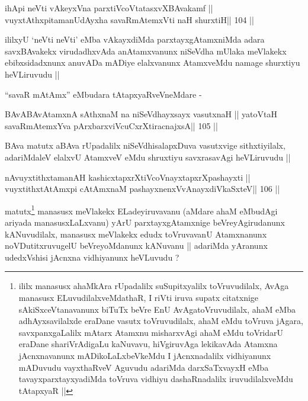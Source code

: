 \begin{shl}
ihApi neVti vAkeyxVna parxtiVcoV\s tatasxvXBAvakamf ||
vuyxtAthxpitamanUdAyx\s\s ha savaRmAtemxVti naH shurxtiH\hfill || 104 ||
\end{shl}

\begin{artha}
ililxyU `neVti neVti' eMba vAkayxdiMda parxtayxgAtamxniMda adara
savxBAvakekx virudadhxvAda anAtamxvanunx niSeVdha mUlaka meVlakekx
ebibxsidadxnunx anuvADa mADiye elalxvanunx AtamxveMdu namage shurxtiyu
heVLiruvudu ||
\end{artha}

\begin{artha}
``savaR mAtAmx'' eMbudara tAtapxyaRveVneMdare -
\end{artha}

\begin{shl}
BAvABAvAtamxnA sAthxnaM na niSeVdhayxsayx vasutxnaH ||
yatoV\s taH savaRmAtemxYva pArxbarxviVcuCxrXtiracnajxsA\hfill || 105 ||
\end{shl}

\begin{artha}
BAva matutx aBAva rUpadalilx niSeVdhisalapxDuva vasutxvige
sithxtiyilalx, adariMdaleV elalxvU AtamxveV eMdu shruxtiyu
savxrasavAgi heVLiruvudu ||
\end{artha}

\begin{shl}
nAvuyxtithxtamanAH kashicxtapxrXtiVcoV\s nayxtapxrXpashayxti ||
vuyxtithxtAtAmx\s pi cA\s\s tAmxnaM pashayxnenxVvAnayxdiVkaSxteV\hfill || 106 ||
\end{shl}

\begin{artha}
matutx\footnote[1]{ililx manasusx ahaMkAra rUpadalilx suSupitxyalilx
  toVruvudilalx, AvAga manasusx ELuvudilalxveMdathaR, I riVti iruva
  supatx citatxnige sAkiSxceVtanavanunx biTuTx beVre EnU
  AvAgatoVruvudilalx, ahaM eMba adhAyxsavilalxde eraDane vasutx
  toVruvudilalx, ahaM eMdu toVruva jAgara, savxpanxgaLalilx mAtarx
  Atamxnu misharxvAgi ahaM eMdu toVridarU eraDane shariVrAdigaLu
  kaNuvavu, hiVgiruvAga lekikavAda Atamxna jAcnxnavanunx
  mADikoLaLxbeVkeMdu I jAcnxnadalilx vidhiyanunx mADuvudu vayxthaRveV
  Aguvudu adariMda darxSaTxvayxH eMba tavayxparxtayxyadiMda toVruva
  vidhiyu dashaRnadalilx iruvudilalxveMdu tAtapxyaR ||} manasusx meVlakekx ELadeyiruvavanu (aMdare
ahaM eMbudAgi ariyada manasusxLaLxvanu) yArU parxtayxgAtamxnige
beVreyAgirudanunx kANuvudilalx, manasusx meVlakekx edudx toVruvavanU
Atamxnanunx  noVDutitxruvugelU beVreyoMdanunx kANuvanu || adariMda
yAranunx udedxVshisi jAcnxna vidhiyanunx heVLuvudu ?
\end{artha}

